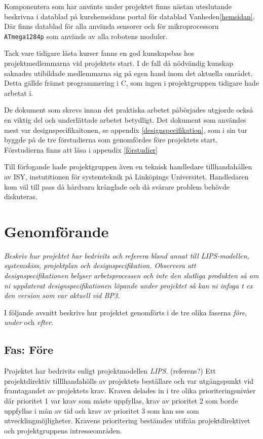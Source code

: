 \documentclass[11pt]{article}
\begin{document}
\begin{flushleft}
Komponentera som har använts under projektet finns nästan uteslutande beskrivna i datablad på kurshemsidans portal för datablad Vanheden\ref{hemsidan}. Där finns datablad för alla använda sensorer och för mikroprocessorn \verb+ATmega1284p+ som används av alla robotens moduler.

Tack vare tidigare lästa kurser fanns en god kunskapsbas hos projektmedlemmarna vid projektets start. I de fall då nödvändig kunskap saknades utibildade medlemmarna sig på egen hand inom det aktuella området. Detta gällde främst programmering i C, som ingen i projektgruppen tidigare hade arbetat i. 

De dokument som skrevs innan det praktiska arbetet påbörjades utgjorde också en viktig del och underlättade arbetet betydligt. Det dokument som användes mest var designspecifikaitonen, se appendix \ref{designspecifikation}, som i sin tur byggde på de tre förstudierna som genomfördes före projektets start. Förstudierna finns att läsa i appendix \ref{förstudier}

Till förfogande hade projektgruppen även en teknisk handledare tillhandahållen av ISY, instutitionen för systemteknik på Linköpings Universitet. Handledaren kom väl till pass då hårdvara krånglade och då svårare problem behövde diskuteras.

\pagebreak

\section{Genomförande}
\textit{Beskriv hur projektet har bedrivits och referera bland annat till LIPS-modellen, systemskiss, projektplan och designspecifikation. Observera att designspecifikationen belyser arbetsprocessen och inte den slutliga produkten så om ni uppdaterat designspecifikationen löpande under projektet så kan ni infoga t ex den version som var aktuell vid BP3.}

I följande avsnitt beskrivs hur projektet genomförts i de tre olika faserna \textit{före}, \textit{under} och \textit{efter}.

\subsection{Fas: Före}
Projektet har bedrivits enligt projektmodellen \textit{LIPS}. (referens?) Ett projektdirektiv tilllhandahölls av projektets beställare och var utgångspunkt vid framtagandet av projektets krav. Kraven delades in i tre olika prioriteringsnivåer där prioritet 1 var krav som måste uppfyllas, krav av prioritet 2 som borde uppfyllas i mån av tid och krav av prioritet 3 som kan ses som utvecklingmöjligheter. Kravens prioritering bestämdes utifrån projektdirektivet och projektgruppens intresseområden. 


\end{flushleft}
\end{document}
